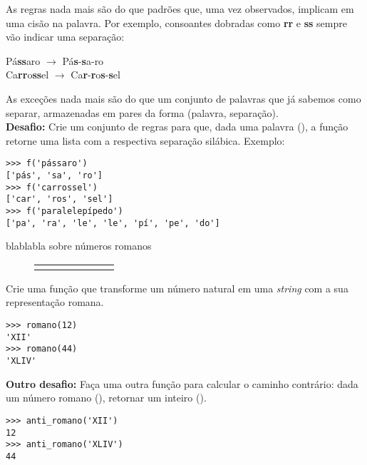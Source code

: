 \documentclass[12pt]{article}
\begin{document}
	As regras nada mais são do que padrões que, uma vez observados, implicam em uma cisão na palavra. Por exemplo, consoantes dobradas como \textbf{rr} e \textbf{ss} sempre vão indicar uma separação:
	
	\begin{center}
		Pá\textbf{ss}aro $\to$ Pá\textbf{s}-\textbf{s}a-ro\\
		Ca\textbf{rr}o\textbf{ss}el $\to$ Ca\textbf{r}-\textbf{r}o\textbf{s}-\textbf{s}el
	\end{center}
	
	As exceções nada mais são do que um conjunto de palavras que já sabemos como separar, armazenadas em pares da forma (palavra, separação).\\
	
	\textbf{Desafio:} Crie um conjunto de regras para que, dada uma palavra (), a função retorne uma lista com a respectiva separação silábica. Exemplo:
	
	\begin{lstlisting}[caption="Separando sílabas"]
>>> f('pássaro')
['pás', 'sa', 'ro']
>>> f('carrossel')
['car', 'ros', 'sel']
>>> f('paralelepípedo')
['pa', 'ra', 'le', 'le', 'pí', 'pe', 'do']
	\end{lstlisting}
	
	
	blablabla sobre números romanos\\
	
	\begin{figure}
		\centering
		\begin{tabular}{|c|c|c|c|c|c|c|}
		\hline		
		& & & & & &\\
		\hline
		& & & & & &\\
		\hline
		\end{tabular}
	\end{figure}
	
	\quest Crie uma função que transforme um número natural em uma \textit{string} com a sua representação romana.
	
	\begin{lstlisting}
>>> romano(12)
'XII'
>>> romano(44)
'XLIV'
	\end{lstlisting}

	\textbf{Outro desafio:} Faça uma outra função para calcular o caminho contrário: dada um número romano (), retornar um inteiro ().

	\begin{lstlisting}
>>> anti_romano('XII')
12
>>> anti_romano('XLIV')
44
	\end{lstlisting}
	
\end{document}
